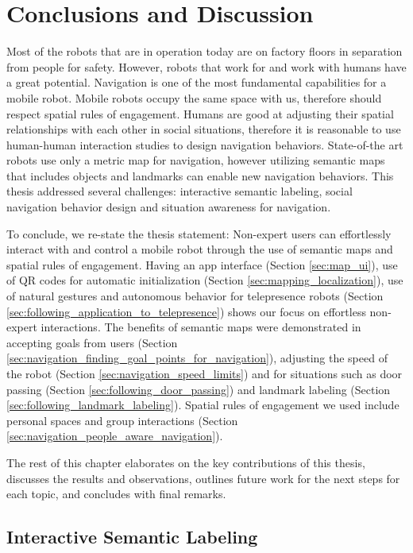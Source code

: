 \chapter{Conclusions and Discussion}
\label{chapter:conclusion}

Most of the robots that are in operation today are on factory floors in separation from people for safety. However, robots that work for and work with humans have a great potential. Navigation is one of the most fundamental capabilities for a mobile robot. Mobile robots occupy the same space with us, therefore should respect spatial rules of engagement. Humans are good at adjusting their spatial relationships with each other in social situations, therefore it is reasonable to use human-human interaction studies to design navigation behaviors. State-of-the art robots use only a metric map for navigation, however utilizing semantic maps that includes objects and landmarks can enable new navigation behaviors. This thesis addressed several challenges: interactive semantic labeling, social navigation behavior design and situation awareness for navigation. 

To conclude, we re-state the thesis statement: Non-expert users can effortlessly interact with and control a mobile robot through the use of semantic maps and spatial rules of engagement. Having an app interface (Section \ref{sec:map_ui}), use of QR codes for automatic initialization (Section \ref{sec:mapping_localization}), use of natural gestures and autonomous behavior for telepresence robots (Section \ref{sec:following_application_to_telepresence}) shows our focus on effortless non-expert interactions. The benefits of semantic maps were demonstrated in accepting goals from users (Section \ref{sec:navigation_finding_goal_points_for_navigation}), adjusting the speed of the robot (Section \ref{sec:navigation_speed_limits}) and for situations such as door passing (Section \ref{sec:following_door_passing}) and landmark labeling (Section \ref{sec:following_landmark_labeling}). Spatial rules of engagement we used include personal spaces and group interactions (Section \ref{sec:navigation_people_aware_navigation}).

The rest of this chapter elaborates on the key contributions of this thesis, discusses the results and observations, outlines future work for the next steps for each topic, and concludes with final remarks.

\section{Interactive Semantic Labeling}

